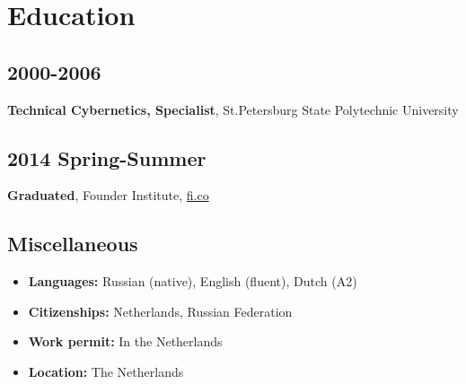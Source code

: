 \section*{Education}

\subsection*{2000-2006}
\textbf{Technical Cybernetics, Specialist}, St.Petersburg State Polytechnic University

\subsection*{2014 Spring-Summer}
\textbf{Graduated}, Founder Institute, \href{https://fi.co}{\url{fi.co}}

\subsection*{Miscellaneous}
\begin{itemize}[noitemsep, nosep]
  \item \textbf{Languages:} Russian (native), English (fluent), Dutch (A2)
  \item \textbf{Citizenships:} Netherlands, Russian Federation
  \item \textbf{Work permit:} In the Netherlands
  \item \textbf{Location:} The Netherlands
\end{itemize}

